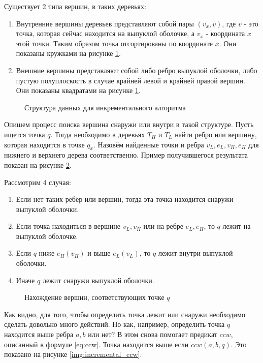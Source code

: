 Существует 2 типа вершин, в таких деревьях:
\begin{enumerate}
	\item Внутренние вершины деревьев представляют собой пары $(v_x, v)$, где $v$ - это точка, которая сейчас находится на выпуклой оболочке, а $v_x$ - координата $x$ этой точки. Таким образом точка отсортированы по координате $x$. Они показаны кружками на рисунке \ref{img:incremental_trees}.
	\item Внешние вершины представляют собой либо ребро выпуклой оболочки, либо пустую полуплоскость в случае крайней левой и крайней правой вершин. Они показаны квадратами на рисунке \ref{img:incremental_trees}.
\end{enumerate}

\begin{figure}[ht] 
	\centering
	
	\caption{Структура данных для инкрементального алгоритма}
	\label{img:incremental_trees}
\end{figure}

Опишем процесс поиска вершина снаружи или внутри в такой структуре. Пусть ищется точка $q$. Тогда необходимо в деревьях $T_H$ и $T_L$ найти ребро или вершину, которая находится в точке $q_x$. Назовём найденные точки и ребра $v_L, e_L, v_H, e_H$ для нижнего и верхнего дерева соответственно. Пример получившегося результата показан на рисунке \ref{img:incremental_locate}.

Рассмотрим 4 случая:
\begin{enumerate}
	\item Если нет таких ребёр или вершин, тогда эта точка находится снаружи выпуклой оболочки.
	\item Если точка находиться в вершине $v_L, v_H$ или на ребре $e_L, e_H$, то $q$ лежит на выпуклой оболочке.
	\item Если $q$ ниже $e_H (v_H)$ и выше $e_L (v_L)$, то $q$ лежит внутри выпуклой оболочки.
	\item Иначе $q$ лежит снаружи выпуклой оболочки.
\end{enumerate}

\begin{figure}[H] 
	\centering
	
	\caption{Нахождение вершин, соответствующих точке $q$}
	\label{img:incremental_locate}
\end{figure}

Как видно, для того, чтобы определить точка лежит или снаружи необходимо сделать довольно много действий. Но как, например, определить точка $q$ находится выше ребра $a, b$  или нет? В этом снова помогает предикат $ccw$, описанный в формуле \ref{eq:ccw}. Точка находится выше если $ccw(a, b, q)$. Это показано на рисунке \ref{img:incremental_ccw}.

